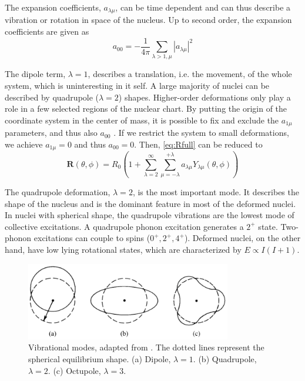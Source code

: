 \documentclass[twoside,english]{uiofysmaster/uiofysmaster}
\let\orgautoref\autoref
\renewcommand{\autoref}
        {%
		 \def\sectionautorefname{Section}%
		 \def\subsectionautorefname{Section}%
		 \def\subsubsectionautorefname{Section}%
		 \def\chapterautorefname{Chapter}%
          \orgautoref}
\begin{document}
The expansion coefficients, $a_{\lambda \mu}$, can be time dependent and can thus describe a vibration or rotation in space of the nucleus. 
Up to second order, the expansion coefficients are given as
\begin{equation}
	a_{00} = -\frac{1}{4\pi} \sum_{\lambda > 1, \mu} | a_{\lambda\mu} |^2
\end{equation}

The dipole term, $\lambda = 1$, describes a translation, i.e. the movement, of the whole system, which is uninteresting in it self. 
A large majority of nuclei can be described by quadrupole ($\lambda = 2$) shapes.
Higher-order deformations only play a role in a few selected regions of the nuclear chart.
By putting the origin of the coordinate system in the center of mass, it is possible to fix and exclude the $a_{1\mu}$ parameters, and thus also $a_{00}$ \cite{RS}. 
If we restrict the system to small deformations, we achieve $a_{1\mu} = 0$ and thus $a_{00} = 0$.
Then, \autoref{eq:Rfull} can be reduced to
\begin{equation}\label{eq:Rmid}
	\mathbf{R}(\theta, \phi) = R_0 \left( 1 +  \sum^\infty_{\lambda = 2} \sum^{+\lambda}_{\mu = -\lambda} a_{\lambda \mu} Y_{\lambda \mu}(\theta, \phi) \right)
\end{equation}


The quadrupole deformation, $\lambda = 2$, is the most important mode.
It describes the shape of the nucleus and is the dominant feature in most of the deformed nuclei. 
In nuclei with spherical shape, the quadrupole vibrations are the lowest mode of collective excitations.
A quadrupole phonon excitation generates a $2^+$ state. 
Two-phonon excitations can couple to spins ($0^+,2^+,4^+$). 
Deformed nuclei, on the other hand, have low lying rotational states, which are characterized by
$E \propto I(I+1)$.

\begin{figure}[ht]
	\centering
	\includegraphics[width=0.8\textwidth]{Images/vibration-modes-3.png}
	\caption{Vibrational modes, adapted from \cite{Krane}. 
	The dotted lines represent the spherical equilibrium shape.
	(a) Dipole, $\lambda = 1$. 
	(b) Quadrupole, $\lambda = 2$. 
	(c) Octupole, $\lambda = 3$.}
	\label{fig:vibrational-modes}
\end{figure}
\end{document}
